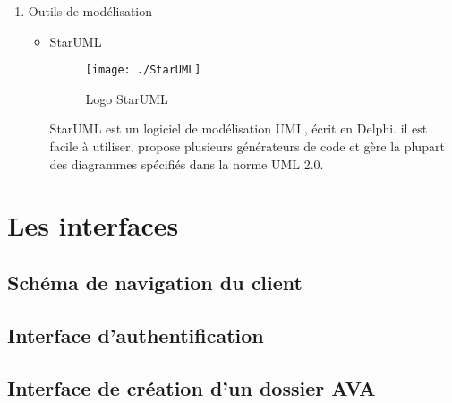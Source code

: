 \begin{enumerate}[label=(\alph*)]
\begin{itemize}
\end{itemize}


\item{Outils de modélisation}

\begin{itemize}
\item StarUML
\begin{figure}[!h]
\begin{center}

\texttt{[image: ./StarUML]}

\caption{Logo StarUML}
\end{center}
\end{figure}


StarUML est un logiciel de modélisation UML, écrit en Delphi. il est facile à utiliser, propose plusieurs générateurs de code et gère la plupart des diagrammes spécifiés dans la norme UML 2.0.\cite{cite2}

\end{itemize}
\end{enumerate}
\section{Les interfaces}
\subsection{Schéma de navigation du client}


\subsection{Interface d'authentification}


\subsection{Interface de création d'un dossier AVA}
